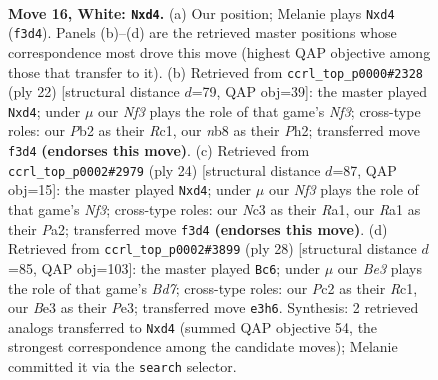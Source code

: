 \documentclass[11pt]{article}
\begin{document}
\clearpage

\begin{figure}[p]\centering
\begin{subfigure}{0.46\textwidth}\centering
\resizebox{\linewidth}{!}{%
\newchessgame
\chessboard[
  setfen={rnb1k2r/1p4b1/3pq1p1/p4p1p/3p4/2N1BN2/PPP2PPP/R2Q1KR1 w kq - 0 16},
  showmover=false,
  pgfstyle=straightmove, color=movearrow, markmove={f3-d4}
]}
\caption{}
\end{subfigure}\hfill
\begin{subfigure}{0.46\textwidth}\centering
\resizebox{\linewidth}{!}{%
\newchessgame
\chessboard[
  setfen={rnb2rk1/pp2qpp1/4p2p/8/1bBpN3/4PN2/PP3PPP/2RQ1RK1 w - - 2 12},
  showmover=false,
  pgfstyle=straightmove, color=movearrow, markmove={f3-d4}
]}
\caption{}
\end{subfigure}
\\[4pt]
\begin{subfigure}{0.46\textwidth}\centering
\resizebox{\linewidth}{!}{%
\newchessgame
\chessboard[
  setfen={r3k2r/p1pbq1bp/2pp1p2/6p1/3pP3/5NB1/PPP2PPP/R2Q1RK1 w kq - 0 13},
  showmover=false,
  pgfstyle=straightmove, color=movearrow, markmove={f3-d4}
]}
\caption{}
\end{subfigure}\hfill
\begin{subfigure}{0.46\textwidth}\centering
\resizebox{\linewidth}{!}{%
\newchessgame
\chessboard[
  setfen={r2q1rk1/pb1B1p2/1p3bpp/3p4/3p4/2N1PN2/PP3PPP/2RQ1RK1 w - - 0 15},
  showmover=false,
  pgfstyle=straightmove, color=movearrow, markmove={d7-c6}
]}
\caption{}
\end{subfigure}
\caption{\textbf{Move 16, White: \texttt{Nxd4}.} (a) Our position; Melanie plays \texttt{Nxd4} (\texttt{f3d4}). Panels (b)--(d) are the retrieved master positions whose correspondence most drove this move (highest QAP objective among those that transfer to it). (b) Retrieved from \texttt{ccrl\_top\_p0000\#2328} (ply 22) [structural distance $d$=79, QAP obj=39]: the master played \texttt{Nxd4}; under $\mu$ our \emph{Nf3} plays the role of that game's \emph{Nf3}; cross-type roles: our \emph{P}b2 as their \emph{R}c1, our \emph{n}b8 as their \emph{P}h2; transferred move \texttt{f3d4} \textbf{(endorses this move)}. (c) Retrieved from \texttt{ccrl\_top\_p0002\#2979} (ply 24) [structural distance $d$=87, QAP obj=15]: the master played \texttt{Nxd4}; under $\mu$ our \emph{Nf3} plays the role of that game's \emph{Nf3}; cross-type roles: our \emph{N}c3 as their \emph{R}a1, our \emph{R}a1 as their \emph{P}a2; transferred move \texttt{f3d4} \textbf{(endorses this move)}. (d) Retrieved from \texttt{ccrl\_top\_p0002\#3899} (ply 28) [structural distance $d$=85, QAP obj=103]: the master played \texttt{Bc6}; under $\mu$ our \emph{Be3} plays the role of that game's \emph{Bd7}; cross-type roles: our \emph{P}c2 as their \emph{R}c1, our \emph{B}e3 as their \emph{P}e3; transferred move \texttt{e3h6}. Synthesis: 2 retrieved analogs transferred to \texttt{Nxd4} (summed QAP objective 54, the strongest correspondence among the candidate moves); Melanie committed it via the \texttt{search} selector.}
\label{fig:thought-m30}
\end{figure}
\end{document}

